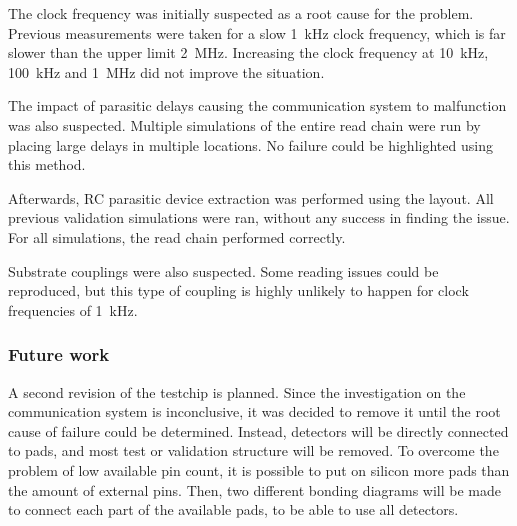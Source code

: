 The clock frequency was initially suspected as a root cause for the problem.
Previous measurements were taken for a slow \SI{1}{\kilo\hertz} clock frequency, which is far slower than the upper limit \SI{2}{\mega\hertz}.
Increasing the clock frequency at \SI{10}{\kilo\hertz}, \SI{100}{\kilo\hertz} and \SI{1}{\mega\hertz} did not improve the situation.

The impact of parasitic delays causing the communication system to malfunction was also suspected.
Multiple simulations of the entire read chain were run by placing large delays in multiple locations.
No failure could be highlighted using this method.

Afterwards, RC parasitic device extraction was performed using the layout.
All previous validation simulations were ran, without any success in finding the issue.
For all simulations, the read chain performed correctly.

Substrate couplings were also suspected.
Some reading issues could be reproduced, but this type of coupling is highly unlikely to happen for clock frequencies of \SI{1}{\kilo\hertz}.

\subsubsection{Future work}

A second revision of the testchip is planned.
Since the investigation on the communication system is inconclusive, it was decided to remove it until the root cause of failure could be determined.
Instead, detectors will be directly connected to pads, and most test or validation structure will be removed.
To overcome the problem of low available pin count, it is possible to put on silicon more pads than the amount of external pins.
Then, two different bonding diagrams will be made to connect each part of the available pads, to be able to use all detectors.
